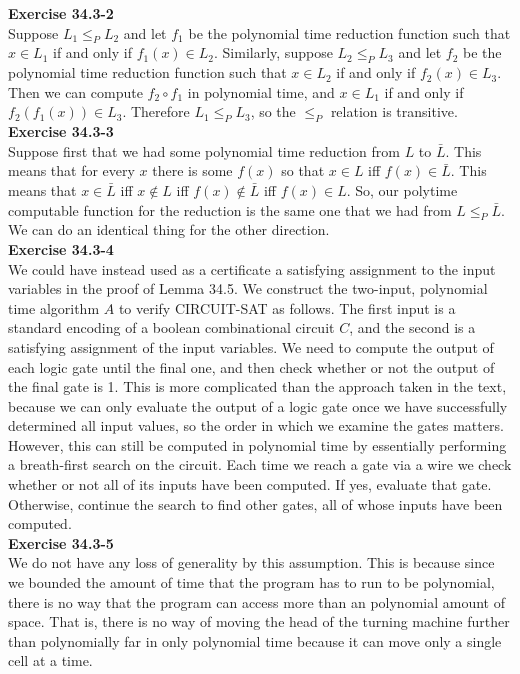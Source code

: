 \documentclass{article}
\begin{document}
\noindent\textbf{Exercise 34.3-2}\\

Suppose $L_1 \leq_P L_2$ and let $f_1$ be the polynomial time reduction function such that $x \in L_1$ if and only if $f_1(x) \in L_2$.  Similarly, suppose $L_2 \leq_P L_3$ and let $f_2$ be the polynomial time reduction function such that $x \in L_2$ if and only if $f_2(x) \in L_3$.  Then we can compute $f_2 \circ f_1$ in polynomial time, and $x \in L_1$ if and only if $f_2(f_1(x)) \in L_3$.  Therefore $L_1 \leq_P L_3$, so the $\leq_P$ relation is transitive. \\

\noindent\textbf{Exercise 34.3-3}\\

Suppose first that we had some polynomial time reduction from $L$ to $\bar{L}$. This means that for every $x$ there is some $f(x)$ so that $x\in L$ iff $f(x)\in \bar{L}$. This means that $x\in \bar{L}$ iff $x\not\in L$ iff $f(x)\not\in\bar{L}$ iff $f(x)\in L$. So, our polytime computable function for the reduction is the same one that we had from $L\le_P \bar{L}$. We can do an identical thing for the other direction.\\

\noindent\textbf{Exercise 34.3-4}\\

We could have instead used as a certificate a satisfying assignment to the input variables in the proof of Lemma 34.5.  We construct the two-input, polynomial time algorithm $A$ to verify CIRCUIT-SAT as follows.  The first input is a standard encoding of a boolean combinational circuit $C$, and the second is a satisfying assignment of the input variables.  We need to compute the output of each logic gate until the final one, and then check whether or not the output of the final gate is 1.  This is more complicated than the approach taken in the text, because we can only evaluate the output of a logic gate once we have successfully determined all input values, so the order in which we examine the gates matters.  However, this can still be computed in polynomial time by essentially performing a breath-first search on the circuit. Each time we reach a gate via a wire we check whether or not all of its inputs have been computed.  If yes, evaluate that gate.  Otherwise, continue the search to find other gates, all of whose inputs have been computed. \\


\noindent\textbf{Exercise 34.3-5}\\
We do not have any loss of generality by this assumption. This is because since we bounded the amount of time that the program has to run to be polynomial, there is no way that the program can access more than an polynomial amount of space. That is, there is no way of moving the head of the turning machine further than polynomially far in only polynomial time because it can move only a single cell at a time.\\
\end{document}
